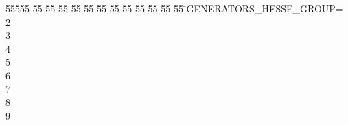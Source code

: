 %
%
\begin{tabbing}
55555 \= 55 \= 55 \= 55 \= 55 \= 55 \= 55 \= 55 \= 55 \= 55 \= 55 \= 55 \= 55 \= \>GENERATORS\_HESSE\_GROUP=\\[0pt]
2\ \\[0pt]
3\ \\[0pt]
4\ \\[0pt]
5\ \\[0pt]
6\ \\[0pt]
7\ \\[0pt]
8\\[0pt]
9\>\end{tabbing}
